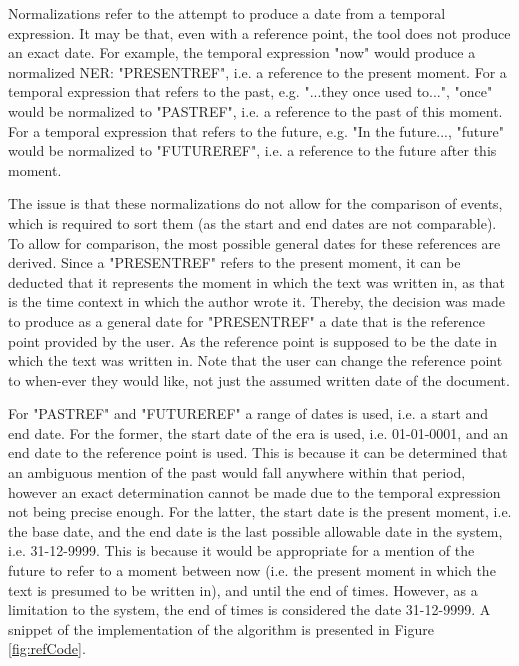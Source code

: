 \par Normalizations refer to the attempt to produce a date from a temporal expression. It may be that, even with a reference point, the tool does not produce an exact date. For example, the temporal expression "now" would produce a normalized NER: "PRESENT\textunderscore REF", i.e. a reference to the present moment. For a temporal expression that refers to the past, e.g. "...they once used to...", "once" would be normalized to "PAST\textunderscore REF", i.e. a reference to the past of this moment. For a temporal expression that refers to the future, e.g. "In the future..., "future" would be normalized to "FUTURE\textunderscore REF", i.e. a reference to the future after this moment. 

\par The issue is that these normalizations do not allow for the comparison of events, which is required to sort them (as the start and end dates are not comparable). To allow for comparison, the most possible general dates for these references are derived. Since a "PRESENT\textunderscore REF" refers to the present moment, it can be deducted that it represents the moment in which the text was written in, as that is the time context in which the author wrote it. Thereby, the decision was made to produce as a general date for "PRESENT\textunderscore REF" a date that is the reference point provided by the user. As the reference point is supposed to be the date in which the text was written in. Note that the user can change the reference point to when-ever they would like, not just the assumed written date of the document. 

\par For "PAST\textunderscore REF" and "FUTURE\textunderscore REF" a range of dates is used, i.e. a start and end date. For the former, the start date of the era is used, i.e. 01-01-0001, and an end date to the reference point is used. This is because it can be determined that an ambiguous mention of the past would fall anywhere within that period, however an exact determination cannot be made due to the temporal expression not being precise enough. For the latter, the start date is the present moment, i.e. the base date, and the end date is the last possible allowable date in the system, i.e. 31-12-9999. This is because it would be appropriate for a mention of the future to refer to a moment between now (i.e. the present moment in which the text is presumed to be written in), and until the end of times. However, as a limitation to the system, the end of times is considered the date 31-12-9999. A snippet of the implementation of the algorithm is presented in Figure \ref{fig:refCode}.

